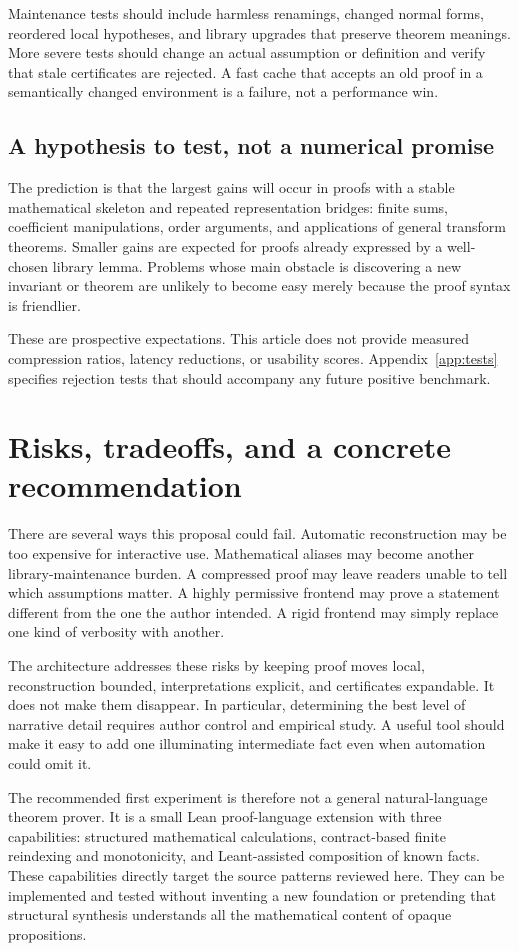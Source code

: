 \documentclass[11pt,a4paper]{article}
\theoremstyle{remark}
\begin{document}
Maintenance tests should include harmless renamings, changed normal forms, reordered local hypotheses, and library upgrades that preserve theorem meanings. More severe tests should change an actual assumption or definition and verify that stale certificates are rejected. A fast cache that accepts an old proof in a semantically changed environment is a failure, not a performance win.

\subsection{A hypothesis to test, not a numerical promise}
The prediction is that the largest gains will occur in proofs with a stable mathematical skeleton and repeated representation bridges: finite sums, coefficient manipulations, order arguments, and applications of general transform theorems. Smaller gains are expected for proofs already expressed by a well-chosen library lemma. Problems whose main obstacle is discovering a new invariant or theorem are unlikely to become easy merely because the proof syntax is friendlier.

These are prospective expectations. This article does not provide measured compression ratios, latency reductions, or usability scores. Appendix~\ref{app:tests} specifies rejection tests that should accompany any future positive benchmark.

\section{Risks, tradeoffs, and a concrete recommendation}
\label{sec:conclusion}
There are several ways this proposal could fail. Automatic reconstruction may be too expensive for interactive use. Mathematical aliases may become another library-maintenance burden. A compressed proof may leave readers unable to tell which assumptions matter. A highly permissive frontend may prove a statement different from the one the author intended. A rigid frontend may simply replace one kind of verbosity with another.

The architecture addresses these risks by keeping proof moves local, reconstruction bounded, interpretations explicit, and certificates expandable. It does not make them disappear. In particular, determining the best level of narrative detail requires author control and empirical study. A useful tool should make it easy to add one illuminating intermediate fact even when automation could omit it.

The recommended first experiment is therefore not a general natural-language theorem prover. It is a small Lean proof-language extension with three capabilities: structured mathematical calculations, contract-based finite reindexing and monotonicity, and Leant-assisted composition of known facts. These capabilities directly target the source patterns reviewed here. They can be implemented and tested without inventing a new foundation or pretending that structural synthesis understands all the mathematical content of opaque propositions.
\end{document}
